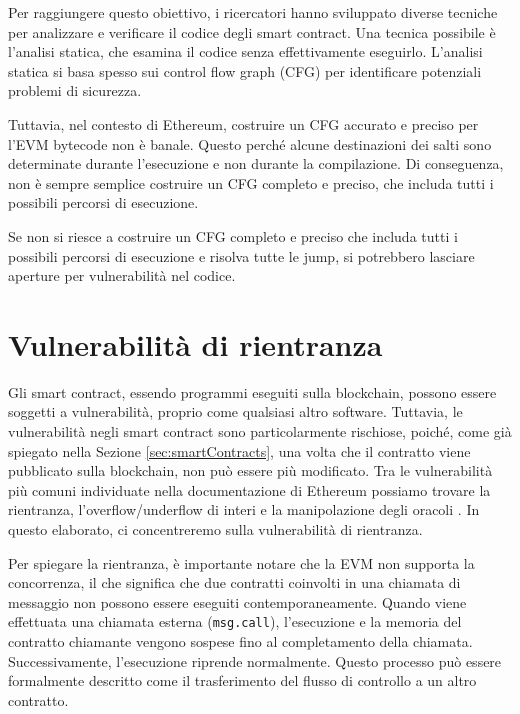Per raggiungere questo obiettivo, i ricercatori hanno sviluppato diverse tecniche per analizzare e verificare il codice degli smart contract. Una tecnica 
possibile è l'analisi statica, che esamina il codice senza effettivamente eseguirlo. L'analisi statica si basa spesso sui control flow graph (CFG) per 
identificare potenziali problemi di sicurezza. 

Tuttavia, nel contesto di Ethereum, costruire un CFG accurato e preciso per l'EVM bytecode non è banale. Questo perché alcune destinazioni dei salti sono 
determinate durante l'esecuzione e non durante la compilazione. Di conseguenza, non è sempre semplice costruire un CFG completo e preciso, che includa 
tutti i possibili percorsi di esecuzione.

Se non si riesce a costruire un CFG completo e preciso che includa tutti i possibili percorsi di esecuzione e risolva tutte le jump, si potrebbero lasciare 
aperture per vulnerabilità nel codice.


\newpage
\section{Vulnerabilità di rientranza}\label{sec:vulnerabilita}
Gli smart contract, essendo programmi eseguiti sulla blockchain, possono essere soggetti a vulnerabilità, proprio come qualsiasi altro software. 
Tuttavia, le vulnerabilità negli smart contract sono particolarmente rischiose, poiché, come già spiegato nella Sezione \ref*{sec:smartContracts},
una volta che il contratto viene pubblicato sulla blockchain, non può essere più modificato. Tra le vulnerabilità più comuni individuate nella 
documentazione di Ethereum possiamo trovare la rientranza, l'overflow/underflow di interi e la manipolazione degli oracoli \cite{davidetarpini}.
In questo elaborato, ci concentreremo sulla vulnerabilità di rientranza.

Per spiegare la rientranza, è importante notare che la EVM non supporta la concorrenza, il che significa che due contratti coinvolti in una 
chiamata di messaggio non possono essere eseguiti contemporaneamente. Quando viene effettuata una chiamata esterna ({\tt msg.call}), l'esecuzione 
e la memoria del contratto chiamante vengono sospese fino al completamento della chiamata. 
Successivamente, l'esecuzione riprende normalmente. Questo processo può essere formalmente descritto come il trasferimento del flusso di controllo a 
un altro contratto.

